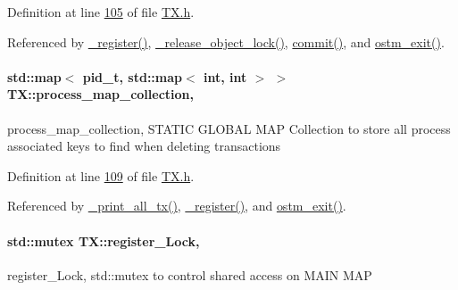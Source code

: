 Definition at line \hyperlink{_t_x_8h_source_l00105}{105} of file \hyperlink{_t_x_8h_source}{T\+X.\+h}.



Referenced by \hyperlink{_t_x_8cpp_source_l00096}{\+\_\+register()}, \hyperlink{_t_x_8cpp_source_l00253}{\+\_\+release\+\_\+object\+\_\+lock()}, \hyperlink{_t_x_8cpp_source_l00177}{commit()}, and \hyperlink{_t_x_8cpp_source_l00068}{ostm\+\_\+exit()}.

\paragraph[{\texorpdfstring{process\+\_\+map\+\_\+collection}{process_map_collection}}]{\setlength{\rightskip}{0pt plus 5cm}std\+::map$<$ pid\+\_\+t, std\+::map$<$ int, int $>$ $>$ T\+X\+::process\+\_\+map\+\_\+collection\hspace{0.3cm}{\ttfamily [static]}, {\ttfamily [private]}}\hypertarget{class_t_x_a2e3cd2f52fd93cf6ef3eb3c1cb830b9f_a2e3cd2f52fd93cf6ef3eb3c1cb830b9f}{}\label{class_t_x_a2e3cd2f52fd93cf6ef3eb3c1cb830b9f_a2e3cd2f52fd93cf6ef3eb3c1cb830b9f}
process\+\_\+map\+\_\+collection, S\+T\+A\+T\+IC G\+L\+O\+B\+AL M\+AP Collection to store all process associated keys to find when deleting transactions 

Definition at line \hyperlink{_t_x_8h_source_l00109}{109} of file \hyperlink{_t_x_8h_source}{T\+X.\+h}.



Referenced by \hyperlink{_t_x_8cpp_source_l00311}{\+\_\+print\+\_\+all\+\_\+tx()}, \hyperlink{_t_x_8cpp_source_l00096}{\+\_\+register()}, and \hyperlink{_t_x_8cpp_source_l00068}{ostm\+\_\+exit()}.

\paragraph[{\texorpdfstring{register\+\_\+\+Lock}{register_Lock}}]{\setlength{\rightskip}{0pt plus 5cm}std\+::mutex T\+X\+::register\+\_\+\+Lock\hspace{0.3cm}{\ttfamily [static]}, {\ttfamily [private]}}\hypertarget{class_t_x_aa688a8c96fa3cdf8cd92e267463536dc_aa688a8c96fa3cdf8cd92e267463536dc}{}\label{class_t_x_aa688a8c96fa3cdf8cd92e267463536dc_aa688a8c96fa3cdf8cd92e267463536dc}
register\+\_\+\+Lock, std\+::mutex to control shared access on M\+A\+IN M\+AP 

